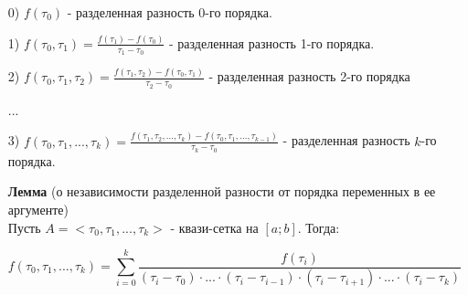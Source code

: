 \documentclass[__main__.tex]{subfiles}
\begin{document}
\begin{itemize}
\item[0)] $f(\tau_0)$ - разделенная разность 0-го порядка.
\item[1)] $f(\tau_0, \tau_1) = \frac{f(\tau_1) - f(\tau_0)}{\tau_1 - \tau_0}$ - разделенная разность 1-го порядка.
\item[2)] $f(\tau_0, \tau_1, \tau_2) = \frac{f(\tau_1, \tau_2) - f(\tau_0, \tau_1)}{\tau_2 - \tau_0}$ - разделенная разность 2-го порядка
\item[...]
\item[3)] $f(\tau_0, \tau_1, \text{...}, \tau_k) = \frac{f(\tau_1, \tau_2, \text{...}, \tau_k) - f(\tau_0, \tau_1, \text{...}, \tau_{k-1})}{\tau_k - \tau_0}$ - разделенная разность $k$-го порядка.

\textbf{Лемма} (о независимости разделенной разности от порядка переменных в ее аргументе)\\
Пусть $A = <\tau_0, \tau_1, \text{...}, \tau_k>$ - квази-сетка на $[a;b]$. Тогда:

$$f(\tau_0, \tau_1, \text{...}, \tau_k) = \sum_{i = 0}^k \frac{f(\tau_i)}{(\tau_i - \tau_0) \cdot \text{...} \cdot (\tau_i - \tau_{i - 1}) \cdot (\tau_i - \tau_{i+1}) \cdot \text{...} \cdot (\tau_i - \tau_k)}$$
 
\end{itemize}
\end{document}

